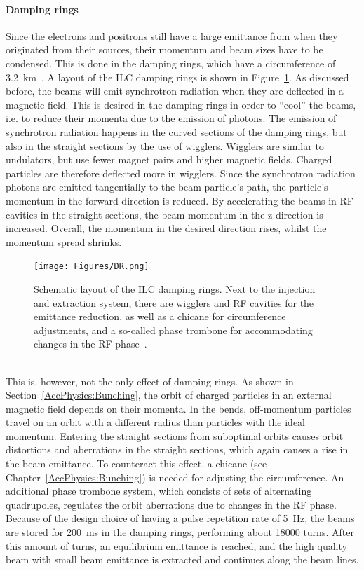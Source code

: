 \paragraph{Damping rings}
Since the electrons and positrons still have a large emittance from when they originated from their sources, their momentum and beam sizes have to be condensed.
This is done in the damping rings, which have a circumference of \SI{3.2}{\kilo\meter}~\cite[p. 14]{TDR32}.
A layout of the ILC damping rings is shown in Figure~\ref{fig:DR}.
As discussed before, the beams will emit synchrotron radiation when they are deflected in a magnetic field.
This is desired in the damping rings in order to ``cool'' the beams, i.e. to reduce their momenta due to the emission of photons.
The emission of synchrotron radiation happens in the curved sections of the damping rings, but also in the straight sections by the use of wigglers.
Wigglers are similar to undulators, but use fewer magnet pairs and higher magnetic fields.
Charged particles are therefore deflected more in wigglers.
Since the synchrotron radiation photons are emitted tangentially to the beam particle's path, the particle's momentum in the forward direction is reduced.
By accelerating the beams in RF cavities in the straight sections, the beam momentum in the z-direction is increased.
Overall, the momentum in the desired direction rises, whilst the momentum spread shrinks.
\begin{figure}[h]
\centering
\texttt{[image: Figures/DR.png]}
\caption[Damping ring layout]{Schematic layout of the ILC damping rings.
Next to the injection and extraction system, there are wigglers and RF cavities for the emittance reduction, as well as a chicane for circumference adjustments, and a so-called phase trombone for accommodating changes in the RF phase~\cite[p. 15]{TDR32}.}
\label{fig:DR}
\end{figure}
\\This is, however, not the only effect of damping rings.
As shown in Section~\ref{AccPhysics:Bunching}, the orbit of charged particles in an external magnetic field depends on their momenta.
In the bends, off-momentum particles travel on an orbit with a different radius than particles with the ideal momentum.
Entering the straight sections from suboptimal orbits causes orbit distortions and aberrations in the straight sections, which again causes a rise in the beam emittance.
To counteract this effect, a chicane (see Chapter~\ref{AccPhysics:Bunching}) is needed for adjusting the circumference.
An additional phase trombone system, which consists of sets of alternating quadrupoles, regulates the orbit aberrations due to changes in the RF phase.
Because of the design choice of having a pulse repetition rate of \SI{5}{\hertz}, the beams are stored for \SI{200}{\milli\second} in the damping rings, performing about \num{18000} turns.
After this amount of turns, an equilibrium emittance is reached, and the high quality beam with small beam emittance is extracted and continues along the beam lines.

